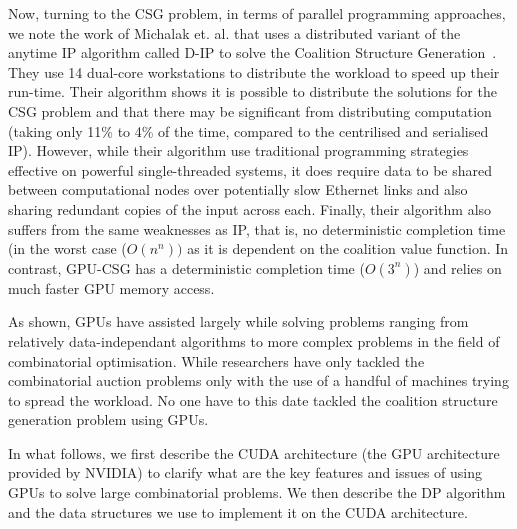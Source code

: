 \documentclass[a4paper, 12pt]{report}
\begin{document}
Now, turning to the CSG problem, in terms of parallel programming approaches, 
we note the work of Michalak et. al. that uses a distributed variant of the
anytime IP algorithm called 
D-IP to solve the Coalition Structure
Generation~\cite{michalak2010distributed}. 
They use 14 dual-core workstations to distribute the workload to speed up their
run-time. 
Their algorithm  shows it is possible to distribute the solutions for the CSG
problem and that there may be
significant from distributing computation (taking only 11\% to 4\% of the time,
compared to the centrilised and serialised IP). 
However, while their algorithm use traditional programming strategies effective
on powerful single-threaded systems, 
it does require data to be shared between computational nodes over potentially
slow Ethernet links and also sharing 
redundant copies of the input across each. Finally, their algorithm also suffers
from the same weaknesses as IP, that is, 
no deterministic completion time (in the worst case ($O(n^n))$ as it is
dependent on the coalition value function. 
In contrast, GPU-CSG has a deterministic completion time ($O(3^n)$) and relies
on much faster GPU memory access.

As shown, GPUs have assisted largely while solving problems ranging from
relatively data-independant algorithms to more complex problems in the field of
combinatorial optimisation. While researchers have only tackled the
combinatorial auction problems only with the use of a handful of machines
trying to spread
the workload. No one have to this date tackled the coalition structure
generation problem using GPUs.

In what follows, we first describe the CUDA architecture (the GPU architecture
provided by NVIDIA) to clarify what 
are the key features and issues of using GPUs to solve large combinatorial
problems.
We then describe the DP algorithm and the data structures we use to implement it
on the CUDA architecture.
\end{document}
